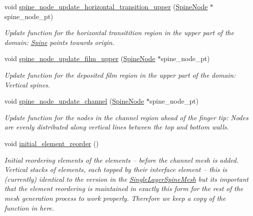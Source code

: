 \begin{DoxyCompactItemize}
void \hyperlink{classoomph_1_1BrethertonSpineMesh_aa9fa4941d8fb02a388e933a7dd1c76a2}{spine\+\_\+node\+\_\+update\+\_\+horizontal\+\_\+transition\+\_\+upper} (\hyperlink{classoomph_1_1SpineNode}{Spine\+Node} $\ast$spine\+\_\+node\+\_\+pt)
\begin{DoxyCompactList}\small\item\em Update function for the horizontal transitition region in the upper part of the domain\+: \hyperlink{classoomph_1_1Spine}{Spine} points towards origin. \end{DoxyCompactList}\item 
void \hyperlink{classoomph_1_1BrethertonSpineMesh_a3919bd086252db283ee5242b4688f8d1}{spine\+\_\+node\+\_\+update\+\_\+film\+\_\+upper} (\hyperlink{classoomph_1_1SpineNode}{Spine\+Node} $\ast$spine\+\_\+node\+\_\+pt)
\begin{DoxyCompactList}\small\item\em Update function for the deposited film region in the upper part of the domain\+: Vertical spines. \end{DoxyCompactList}\item 
void \hyperlink{classoomph_1_1BrethertonSpineMesh_a5a09b6d2f5e7ffd12a0ae882754ad818}{spine\+\_\+node\+\_\+update\+\_\+channel} (\hyperlink{classoomph_1_1SpineNode}{Spine\+Node} $\ast$spine\+\_\+node\+\_\+pt)
\begin{DoxyCompactList}\small\item\em Update function for the nodes in the channel region ahead of the finger tip\+: Nodes are evenly distributed along vertical lines between the top and bottom walls. \end{DoxyCompactList}\item 
void \hyperlink{classoomph_1_1BrethertonSpineMesh_a52ffe1a705cb720d09c831b9cf5397f6}{initial\+\_\+element\+\_\+reorder} ()
\begin{DoxyCompactList}\small\item\em Initial reordering elements of the elements -- before the channel mesh is added. Vertical stacks of elements, each topped by their interface element -- this is (currently) identical to the version in the \hyperlink{classoomph_1_1SingleLayerSpineMesh}{Single\+Layer\+Spine\+Mesh} but it\textquotesingle{}s important that the element reordering is maintained in exactly this form for the rest of the mesh generation process to work properly. Therefore we keep a copy of the function in here. \end{DoxyCompactList}\end{DoxyCompactItemize}
